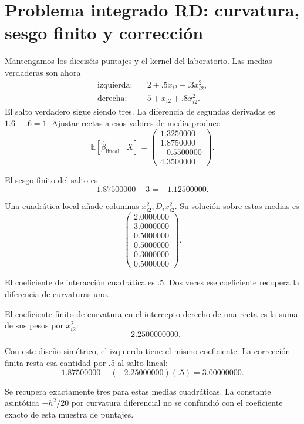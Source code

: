 \documentclass[11pt,a4paper]{article}
\newcommand{\E}{\mathbb E}
\begin{document}
\clearpage
{}
\section{Problema integrado RD: curvatura, sesgo finito y corrección}\label{unidad168}
Mantengamos los dieciséis puntajes y
el kernel del laboratorio.
Las medias verdaderas son ahora
\[
\begin{aligned}
\text{izquierda}:&\quad2+.5x_{i2}+.3x_{i2}^2,\\
\text{derecha}:&\quad5+x_{i2}+.8x_{i2}^2.
\end{aligned}
\]
El salto verdadero sigue siendo tres.
La diferencia de segundas derivadas
es \(1.6-.6=1\).
Ajustar rectas a esos valores
de media produce
\[
\E[\widehat\beta_{\mathrm{lineal}}\mid X]
=\begin{pmatrix}1.3250000\\1.8750000\\-0.5500000\\4.3500000\end{pmatrix}.
\]

El sesgo finito del salto es
\[
1.87500000-3=-1.12500000.
\]

Una cuadrática local añade columnas
\(x_{i2}^2,D_ix_{i2}^2\).
Su solución sobre estas medias es
\[
\begin{pmatrix}2.0000000\\3.0000000\\0.5000000\\0.5000000\\0.3000000\\0.5000000\end{pmatrix}.
\]

El coeficiente de interacción cuadrática
es .5. Dos veces ese coeficiente
recupera la diferencia de curvaturas uno.

El coeficiente finito de curvatura
en el intercepto derecho de una recta
es la suma de sus pesos
por \(x_{i2}^2\):
\[
-2.2500000000.
\]

Con este diseño simétrico,
el izquierdo tiene el mismo coeficiente.
La corrección finita resta
esa cantidad por .5
al salto lineal:
\[
1.87500000-(-2.25000000)(.5)=3.00000000.
\]

Se recupera exactamente tres
para estas medias cuadráticas.
La constante asintótica \(-h^2/20\)
por curvatura diferencial no
se confundió con el coeficiente
exacto de esta muestra de puntajes.
\end{document}
